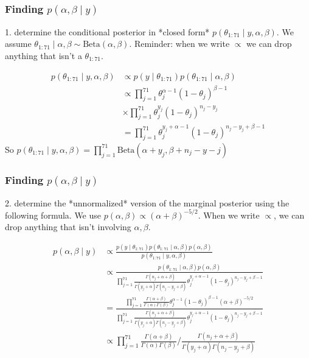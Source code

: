 \documentclass{beamer}
\begin{document}
\begin{frame}
\frametitle{Finding $p(\alpha,\beta \mid y)$ }

1. determine the conditional posterior in *closed form* $p(\theta_{1:71} \mid y, \alpha, \beta)$. We assume $\theta_{1:71} \mid \alpha, \beta \sim \text{Beta}(\alpha,\beta)$. Reminder: when we write $\propto$ we can drop anything that isn't a $\theta_{1:71}$.

\begin{align*}
p(\theta_{1:71} \mid y, \alpha, \beta) &\propto p(y \mid \theta_{1:71})p(\theta_{1:71} \mid \alpha, \beta)\\
&\propto \prod_{j=1}^{71} \theta_j^{\alpha-1}(1-\theta_j)^{\beta-1} \\
&\times \prod_{j=1}^{71}\theta_j^{y_j}(1-\theta_j)^{n_j - y_j} \\
&= \prod_{j=1}^{71}\theta_j^{y_j+\alpha-1}(1-\theta_j)^{n_j - y_j + \beta-1}
\end{align*}
So $p(\theta_{1:71} \mid y, \alpha, \beta) = \prod_{j=1}^{71}\text{Beta}(\alpha + y_j, \beta + n_j - y-j)$


\end{frame}


\begin{frame}
\frametitle{Finding $p(\alpha,\beta \mid y)$ }

2. determine the *unnormalized* version of the marginal posterior using the following formula. We use $p(\alpha, \beta) \propto (\alpha + \beta)^{-5/2}$. When we write $\propto$, we can drop anything that isn't involving $\alpha, \beta$.

\begin{align*}
p(\alpha, \beta \mid y) &\propto \frac{p(y \mid \theta_{1:71})p(\theta_{1:71} \mid \alpha, \beta)p(\alpha, \beta) }{p(\theta_{1:71} \mid y, \alpha, \beta) } \tag{earlier slides} \\
&\propto \frac{p(\theta_{1:71} \mid \alpha, \beta)p(\alpha, \beta) }{ \prod_{j=1}^{71}\frac{\Gamma(n_j + \alpha + \beta )}{ \Gamma(y_j+\alpha)\Gamma(n_j - y_j + \beta) }\theta_j^{y_j+\alpha-1}(1-\theta_j)^{n_j - y_j + \beta-1} } \\
&= \frac{ \prod_{j=1}^{71} \frac{\Gamma(\alpha + \beta )}{ \Gamma(\alpha)\Gamma( \beta) } \theta_j^{\alpha-1}(1-\theta_j)^{\beta-1} (\alpha + \beta)^{-5/2} }{ \prod_{j=1}^{71}\frac{\Gamma(n_j + \alpha + \beta )}{ \Gamma(y_j+\alpha)\Gamma(n_j - y_j + \beta) }\theta_j^{y_j+\alpha-1}(1-\theta_j)^{n_j - y_j + \beta-1} } \\
&\propto \prod_{j=1}^{71} \frac{\Gamma(\alpha + \beta )}{ \Gamma(\alpha)\Gamma( \beta) } \bigg/ \frac{\Gamma(n_j + \alpha + \beta )}{ \Gamma(y_j+\alpha)\Gamma(n_j - y_j + \beta) } 
\end{align*}

\end{frame}
\end{document}
